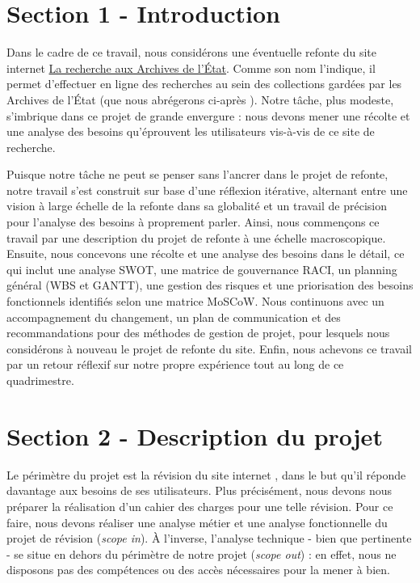 \documentclass[a4paper,12pt]{article}
\begin{document}
\section{Section 1 - Introduction}

Dans le cadre de ce travail, nous considérons une éventuelle refonte du site internet \href{https://search.arch.be/fr/}{La recherche aux Archives de l'État}. Comme son nom l'indique, il permet d'effectuer en ligne des recherches au sein des collections gardées par les Archives de l'État (que nous abrégerons ci-après ). Notre tâche, plus modeste, s'imbrique dans ce projet de grande envergure : nous devons mener une récolte et une analyse des besoins qu'éprouvent les utilisateurs vis-à-vis de ce site de recherche.

Puisque notre tâche ne peut se penser sans l'ancrer dans le projet de refonte, notre travail s'est construit sur base d'une réflexion itérative, alternant entre une vision à large échelle de la refonte dans sa globalité et un travail de précision pour l'analyse des besoins à proprement parler. Ainsi, nous commençons ce travail par une description du projet de refonte à une échelle macroscopique. Ensuite, nous concevons une récolte et une analyse des besoins dans le détail, ce qui inclut une analyse SWOT, une matrice de gouvernance RACI, un planning général (WBS et GANTT), une gestion des risques et une priorisation des besoins fonctionnels identifiés selon une matrice MoSCoW. Nous continuons avec un accompagnement du changement, un plan de communication et des recommandations pour des méthodes de gestion de projet, pour lesquels nous considérons à nouveau le projet de refonte du site. Enfin, nous achevons ce travail par un retour réflexif sur notre propre expérience tout au long de ce quadrimestre.

\section{Section 2 - Description du projet}

Le périmètre du projet est la révision du site internet , dans le but qu'il réponde davantage aux besoins de ses utilisateurs. Plus précisément, nous devons nous préparer la réalisation d'un cahier des charges pour une telle révision. Pour ce faire, nous devons réaliser une analyse métier et une analyse fonctionnelle du projet de révision (\textit{scope in}). À l'inverse, l'analyse technique - bien que pertinente - se situe en dehors du périmètre de notre projet (\textit{scope out}) : en effet, nous ne disposons pas des compétences ou des accès nécessaires pour la mener à bien.
\end{document}
